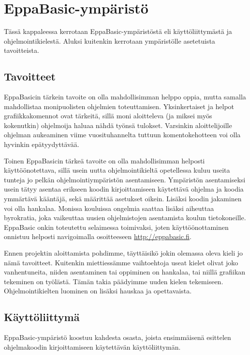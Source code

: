 \section{EppaBasic-ympäristö}
Tässä kappaleessa kerrotaan EppaBasic-ympäristöstä
eli käyttöliittymästä ja ohjelmointikielestä.
Aluksi kuitenkin kerrotaan ympäristölle
asetetuista tavoitteista.

\subsection{Tavoitteet}
EppaBasicin tärkein tavoite on olla
mahdollisimman helppo oppia,
mutta samalla mahdollistaa
monipuolisten ohjelmien toteuttamisen.
Yksinkertaiset ja helpot grafiikkakomennot ovat tärkeitä,
sillä moni aloitteleva (ja miksei myös kokenutkin)
ohjelmoija haluaa nähdä työnsä tulokset.
Varsinkin aloittelijoille ohjelman aukeaminen
viime vuosituhannelta tuttuun komentokehotteen
voi olla hyvinkin epätyydyttävää.

Toinen EppaBasicin tärkeä tavoite on olla
mahdollisimman helposti käyttöönotettava,
sillä usein uutta ohjelmointikieltä opetellessa
kuluu useita tunteja jo pelkän
ohjelmointiympäristön asentamiseen.
Ympäristön asentamiseksi usein
tätyy asentaa erikseen koodin
kirjoittamiseen käytettävä ohjelma
ja koodia ymmärtävä kääntäjä,
sekä määrittää asetukset oikein.
Lisäksi koodin jakaminen
voi olla hankalaa. Monissa kouluissa
ongelmia saattaa lisäksi aiheuttaa byrokratia,
joka vaikeuttaa uusien ohjelmistojen asentamista
koulun tietokoneille.
EppaBasic onkin toteutettu
selaimessa toimivaksi, joten
käyttöönottaminen onnistuu
helposti navigoimalla osoitteeseen
\url{http://eppabasic.fi}.

Ennen projektin aloittamista pohdimme,
täyttäisikö jokin olemassa oleva
kieli jo nämä tavoitteet.
Kuitenkin miettiessämme vaihtoehtoja
useat kielet olivat joko vanhentuneita,
niiden asentaminen tai oppiminen on hankalaa,
tai niillä grafiikan tekeminen on työlästä.
Tämän takia päädyimme uuden kielen tekemiseen.
Ohjelmointikielten luominen on lisäksi hauskaa
ja opettavaista.

\subsection{Käyttöliittymä}
EppaBasic-ympäristö koostuu kahdesta osasta,
joista ensimmäisenä esittelen ohjelmakoodin
kirjoittamiseen käytettävän käyttöliittymän.

